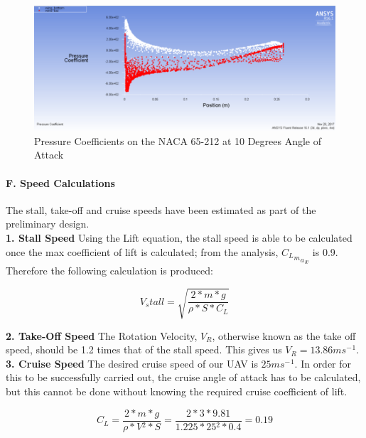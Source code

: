 \documentclass[12pt]{article}
\begin{document}
\begin{figure}[H]
    \includegraphics[width=18cm, scale=1]{pressurecoeff.png}
    \centering
    \caption{Pressure Coefficients on the NACA 65-212 at 10 Degrees Angle of Attack}
    \label{fig:pressurecoeff}
\end{figure}

\paragraph{F. Speed Calculations} The stall, take-off and cruise speeds have been estimated as part of the preliminary design. \\

\noindent \textbf{1. Stall Speed}
\noindent Using the Lift equation, the stall speed is able to be calculated once the max coefficient of lift is calculated; from the analysis, $C{{{{{_L}_m}_a}_x}}$ is 0.9. Therefore the following calculation is produced:

\begin{equation} \label{eq}
V{_stall} = \sqrt{\frac{2*m*g}{\rho *S* C{_L}}}
\end{equation}

\noindent \textbf{2. Take-Off Speed}
\noindent The Rotation Velocity, $V{_R}$, otherwise known as the take off speed, should be 1.2 times that of the stall speed. This gives us $V{_R} = 13.86ms{{^-}^1}$.\cite{TAKEOFFREF} \\

\noindent \textbf{3. Cruise Speed}
\noindent The desired cruise speed of our UAV is $25ms{{^-}^1}$. In order for this to be successfully carried out, the cruise angle of attack has to be calculated, but this cannot be done without knowing the required cruise coefficient of lift.

\begin{equation} \label{eq}
C{_L} = \frac{2*m*g}{\rho * V{^2}*S} = \frac{2*3*9.81}{1.225*25{^2}*0.4} =0.19
\end{equation}
\end{document}

